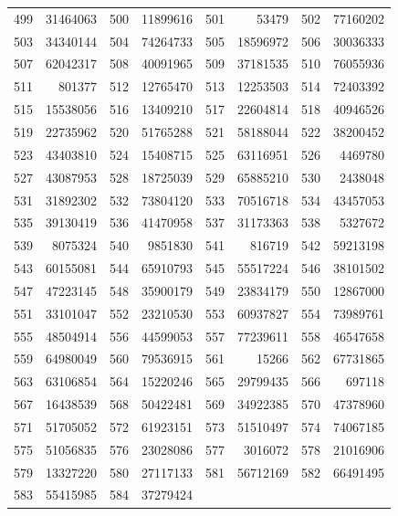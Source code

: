 \begin{longtable}{|r|r|r|r|r|r|r|r|}
499 & 31464063 & 500 & 11899616 & 501 & 53479 & 502 & 77160202 \\
503 & 34340144 & 504 & 74264733 & 505 & 18596972 & 506 & 30036333 \\
507 & 62042317 & 508 & 40091965 & 509 & 37181535 & 510 & 76055936 \\
511 & 801377 & 512 & 12765470 & 513 & 12253503 & 514 & 72403392 \\
515 & 15538056 & 516 & 13409210 & 517 & 22604814 & 518 & 40946526 \\
519 & 22735962 & 520 & 51765288 & 521 & 58188044 & 522 & 38200452 \\
523 & 43403810 & 524 & 15408715 & 525 & 63116951 & 526 & 4469780 \\
527 & 43087953 & 528 & 18725039 & 529 & 65885210 & 530 & 2438048 \\
531 & 31892302 & 532 & 73804120 & 533 & 70516718 & 534 & 43457053 \\
535 & 39130419 & 536 & 41470958 & 537 & 31173363 & 538 & 5327672 \\
539 & 8075324 & 540 & 9851830 & 541 & 816719 & 542 & 59213198 \\
543 & 60155081 & 544 & 65910793 & 545 & 55517224 & 546 & 38101502 \\
547 & 47223145 & 548 & 35900179 & 549 & 23834179 & 550 & 12867000 \\
551 & 33101047 & 552 & 23210530 & 553 & 60937827 & 554 & 73989761 \\
555 & 48504914 & 556 & 44599053 & 557 & 77239611 & 558 & 46547658 \\
559 & 64980049 & 560 & 79536915 & 561 & 15266 & 562 & 67731865 \\
563 & 63106854 & 564 & 15220246 & 565 & 29799435 & 566 & 697118 \\
567 & 16438539 & 568 & 50422481 & 569 & 34922385 & 570 & 47378960 \\
571 & 51705052 & 572 & 61923151 & 573 & 51510497 & 574 & 74067185 \\
575 & 51056835 & 576 & 23028086 & 577 & 3016072 & 578 & 21016906 \\
579 & 13327220 & 580 & 27117133 & 581 & 56712169 & 582 & 66491495 \\
583 & 55415985 & 584 & 37279424 &  &  &  &  \\
\end{longtable}


\normalsize
